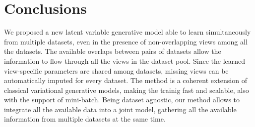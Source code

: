 \section{Conclusions}
 We proposed a new latent variable generative model able to learn simultaneously from multiple datasets, even in the presence of non-overlapping views among all the datasets.
 The available overlaps between pairs of datasets allow the information to flow through all the views in the dataset pool.
 Since the learned view-specific parameters are shared among datasets, missing views can be automatically imputed for every dataset.
 The method is a coherent extension of classical variational generative models, making the trainig fast and scalable, also with the support of mini-batch.
 Being dataset agnostic, our method allows to integrate all the available data into a joint model, gathering  all the available information from multiple datasets at the same time.
